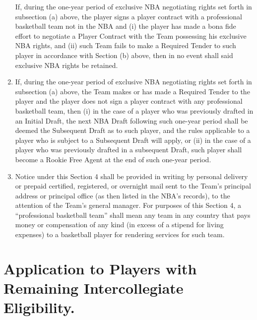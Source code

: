 \documentclass[
]{book}
\begin{document}
\begin{enumerate}
  If, during the one-year period of exclusive NBA negotiating rights set forth in subsection (a) above, the player signs a player contract with a professional basketball team not in the NBA and (i) the player has made a bona fide effort to negotiate a Player Contract with the Team possessing his exclusive NBA rights, and (ii) such Team fails to make a Required Tender to such player in accordance with Section (b) above, then in no event shall said exclusive NBA rights be retained.
\item
  If, during the one-year period of exclusive NBA negotiating rights set forth in subsection (a) above, the Team makes or has made a Required Tender to the player and the player does not sign a player contract with any professional basketball team, then (i) in the case of a player who was previously drafted in an Initial Draft, the next NBA Draft following such one-year period shall be deemed the Subsequent Draft as to such player, and the rules applicable to a player who is subject to a Subsequent Draft will apply, or (ii) in the case of a player who was previously drafted in a subsequent Draft, such player shall become a Rookie Free Agent at the end of such one-year period.
\item
  Notice under this Section 4 shall be provided in writing by personal delivery or prepaid certified, registered, or overnight mail sent to the Team's principal address or principal office (as then listed in the NBA's records), to the attention of the Team's general manager. For purposes of this Section 4, a ``professional basketball team'' shall mean any team in any country that pays money or compensation of any kind (in excess of a stipend for living expenses) to a basketball player for rendering services for such team.
\end{enumerate}

\hypertarget{application-to-players-with-remaining-intercollegiate-eligibility.}{%
\section{Application to Players with Remaining Intercollegiate Eligibility.}\label{application-to-players-with-remaining-intercollegiate-eligibility.}}
\end{document}

